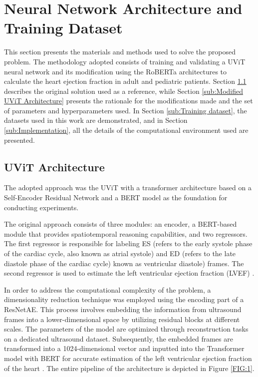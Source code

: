 \documentclass[a4paper,fleqn]{cas-dc}
\begin{document}
\section{Neural Network Architecture and Training Dataset} \label{sec:3}

This section presents the materials and methods used to solve the proposed problem. The methodology adopted consists of training and validating a UViT neural network and its modification using the RoBERTa architectures to calculate the heart ejection fraction in adult and pediatric patients. Section \ref{sub:UViT Architecture} describes the original solution used as a reference, while Section \ref{sub:Modified UViT Architecture} presents the rationale for the modifications made and the set of parameters and hyperparameters used. In Section \ref{sub:Training dataset}, the datasets used in this work are demonstrated, and in Section \ref{sub:Implementation}, all the details of the computational environment used are presented.

\subsection{UViT Architecture} \label{sub:UViT Architecture}

The adopted approach was the UViT with a transformer architecture based on a Self-Encoder Residual Network and a BERT model as the foundation for conducting experiments.

The original approach consists of three modules: an encoder, a BERT-based module that provides spatiotemporal reasoning capabilities, and two regressors. The first regressor is responsible for labeling ES (refers to the early systole phase of the cardiac cycle, also known as atrial systole) and ED (refers to the late diastole phase of the cardiac cycle) known as ventricular diastole) frames. The second regressor is used to estimate the left ventricular ejection fraction (LVEF) \cite{Reynald}.

In order to address the computational complexity of the problem, a dimensionality reduction technique was employed using the encoding part of a ResNetAE. This process involves embedding the information from ultrasound frames into a lower-dimensional space by utilizing residual blocks at different scales. The parameters of the model are optimized through reconstruction tasks on a dedicated ultrasound dataset. Subsequently, the embedded frames are transformed into a 1024-dimensional vector and inputted into the Transformer model with BERT for accurate estimation of the left ventricular ejection fraction of the heart \cite{Reynald}. The entire pipeline of the architecture is depicted in Figure \ref{FIG:1}.
\end{document}
